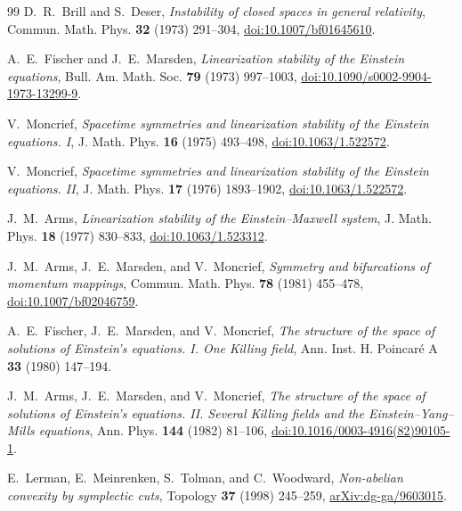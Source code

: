 \documentclass[11pt]{article}
\theoremstyle{definition}
\theoremstyle{remark}
\begin{document}
\begin{thebibliography}{99}
D.~R.~Brill and S.~Deser,
\emph{Instability of closed spaces in general relativity},
Commun. Math. Phys. \textbf{32} (1973) 291--304,
\href{https://doi.org/10.1007/bf01645610}{doi:10.1007/bf01645610}.

A.~E.~Fischer and J.~E.~Marsden,
\emph{Linearization stability of the Einstein equations},
Bull. Am. Math. Soc. \textbf{79} (1973) 997--1003,
\href{https://doi.org/10.1090/s0002-9904-1973-13299-9}{doi:10.1090/s0002-9904-1973-13299-9}.

V.~Moncrief,
\emph{Spacetime symmetries and linearization stability of the Einstein
equations. I}, J. Math. Phys. \textbf{16} (1975) 493--498,
\href{https://doi.org/10.1063/1.522572}{doi:10.1063/1.522572}.

V.~Moncrief,
\emph{Spacetime symmetries and linearization stability of the Einstein
equations. II}, J. Math. Phys. \textbf{17} (1976) 1893--1902,
\href{https://doi.org/10.1063/1.522572}{doi:10.1063/1.522572}.

J.~M.~Arms,
\emph{Linearization stability of the Einstein--Maxwell system},
J. Math. Phys. \textbf{18} (1977) 830--833,
\href{https://doi.org/10.1063/1.523312}{doi:10.1063/1.523312}.

J.~M.~Arms, J.~E.~Marsden, and V.~Moncrief,
\emph{Symmetry and bifurcations of momentum mappings},
Commun. Math. Phys. \textbf{78} (1981) 455--478,
\href{https://doi.org/10.1007/bf02046759}{doi:10.1007/bf02046759}.

A.~E.~Fischer, J.~E.~Marsden, and V.~Moncrief,
\emph{The structure of the space of solutions of Einstein's equations. I.
One Killing field}, Ann. Inst. H. Poincar\'e A \textbf{33} (1980) 147--194.

J.~M.~Arms, J.~E.~Marsden, and V.~Moncrief,
\emph{The structure of the space of solutions of Einstein's equations. II.
Several Killing fields and the Einstein--Yang--Mills equations},
Ann. Phys. \textbf{144} (1982) 81--106,
\href{https://doi.org/10.1016/0003-4916(82)90105-1}{doi:10.1016/0003-4916(82)90105-1}.

E.~Lerman, E.~Meinrenken, S.~Tolman, and C.~Woodward,
\emph{Non-abelian convexity by symplectic cuts},
Topology \textbf{37} (1998) 245--259,
\href{https://arxiv.org/abs/dg-ga/9603015}{arXiv:dg-ga/9603015}.


\end{thebibliography}
\end{document}
